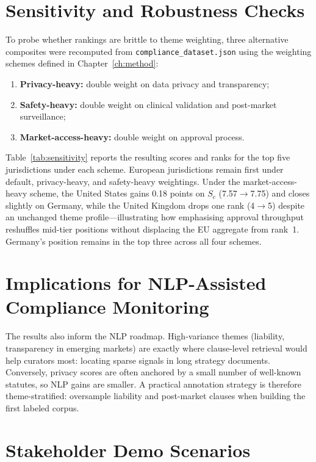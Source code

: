 \section{Sensitivity and Robustness Checks}
\label{sec:sensitivity}

To probe whether rankings are brittle to theme weighting, three alternative composites were recomputed from \texttt{compliance\_dataset.json} using the weighting schemes defined in Chapter~\ref{ch:method}:
\begin{enumerate}[noitemsep]
  \item \textbf{Privacy-heavy:} double weight on data privacy and transparency;
  \item \textbf{Safety-heavy:} double weight on clinical validation and post-market surveillance;
  \item \textbf{Market-access-heavy:} double weight on approval process.
\end{enumerate}
Table~\ref{tab:sensitivity} reports the resulting scores and ranks for the top five jurisdictions under each scheme. European jurisdictions remain first under default, privacy-heavy, and safety-heavy weightings. Under the market-access-heavy scheme, the United States gains 0.18 points on $S_c$ (7.57$\to$7.75) and closes slightly on Germany, while the United Kingdom drops one rank (4$\to$5) despite an unchanged theme profile---illustrating how emphasising approval throughput reshuffles mid-tier positions without displacing the EU aggregate from rank~1. Germany's position remains in the top three across all four schemes.



\section{Implications for NLP-Assisted Compliance Monitoring}
\label{sec:nlpimpl}

The results also inform the NLP roadmap. High-variance themes (liability, transparency in emerging markets) are exactly where clause-level retrieval would help curators most: locating sparse signals in long strategy documents. Conversely, privacy scores are often anchored by a small number of well-known statutes, so NLP gains are smaller. A practical annotation strategy is therefore theme-stratified: oversample liability and post-market clauses when building the first labeled corpus.

\section{Stakeholder Demo Scenarios}
\label{sec:defence}

